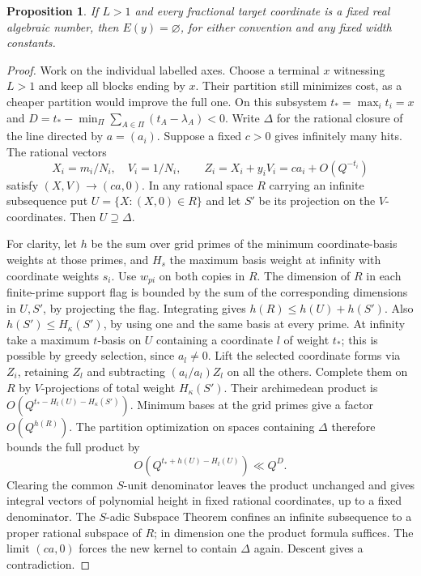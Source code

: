 \documentclass[11pt,reqno,a4paper]{amsart}
\newtheorem{proposition}[theorem]{Proposition}
\theoremstyle{remark}
\numberwithin{equation}{section}
\begin{document}
\begin{proposition}\label{prop:alg}
If \(L>1\) and every fractional target coordinate is a fixed real algebraic number, then \(E(y)=\varnothing\), for either convention and any fixed width constants.
\end{proposition}
\begin{proof}
Work on the individual labelled axes. Choose a terminal \(x\) witnessing \(L>1\) and keep all blocks ending by \(x\). Their partition still minimizes cost, as a cheaper partition would improve the full one. On this subsystem \(t_*=\max_i t_i=x\) and
\(D=t_*-\min_\Pi\sum_{A\in\Pi}(t_A-\lambda_A)<0\).
Write \(\Delta\) for the rational closure of the line directed by \(a=(a_i)\). Suppose a fixed \(c>0\) gives infinitely many hits. The rational vectors
\[
 X_i=m_i/N_i,\quad V_i=1/N_i,\qquad
 Z_i=X_i+y_iV_i=ca_i+O(Q^{-t_i})
\]
satisfy \((X,V)\to(ca,0)\).
In any rational space \(R\) carrying an infinite subsequence put
\(U=\{X:(X,0)\in R\}\) and let \(S'\) be its projection on the \(V\)-coordinates. Then \(U\supseteq\Delta\).

For clarity, let \(h\) be the sum over grid primes of the minimum coordinate-basis weights at those primes, and \(H_s\) the maximum basis weight at infinity with coordinate weights \(s_i\). Use \(w_{pi}\) on both copies in \(R\). The dimension of \(R\) in each finite-prime support flag is bounded by the sum of the corresponding dimensions in \(U,S'\), by projecting the flag. Integrating gives \(h(R)\le h(U)+h(S')\). Also \(h(S')\le H_\kappa(S')\), by using one and the same basis at every prime. At infinity take a maximum \(t\)-basis on \(U\) containing a coordinate \(l\) of weight \(t_*\); this is possible by greedy selection, since \(a_l\ne0\). Lift the selected coordinate forms via \(Z_i\), retaining \(Z_l\) and subtracting \((a_i/a_l)Z_l\) on all the others. Complete them on \(R\) by \(V\)-projections of total weight \(H_\kappa(S')\). Their archimedean product is
\(O(Q^{t_*-H_t(U)-H_\kappa(S')})\).
Minimum bases at the grid primes give a factor \(O(Q^{h(R)})\). The partition optimization on spaces containing \(\Delta\) therefore bounds the full product by
\[
              O(Q^{t_*+h(U)-H_t(U)})\ll Q^D .
\]
Clearing the common \(S\)-unit denominator leaves the product unchanged and gives integral vectors of polynomial height in fixed rational coordinates, up to a fixed denominator. The \(S\)-adic Subspace Theorem \cite{Schlickewei} confines an infinite subsequence to a proper rational subspace of \(R\); in dimension one the product formula suffices. The limit \((ca,0)\) forces the new kernel to contain \(\Delta\) again. Descent gives a contradiction.
\end{proof}
\end{document}
